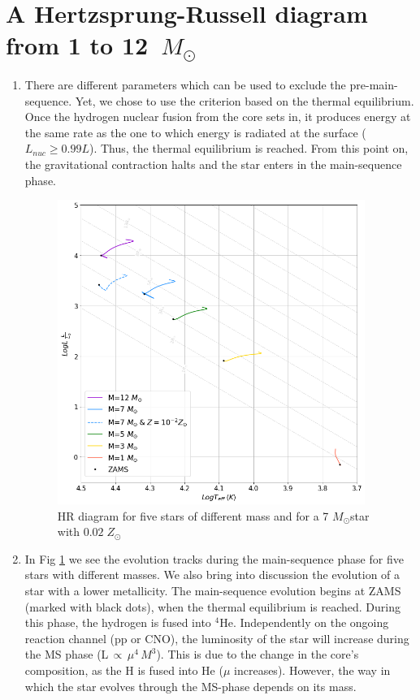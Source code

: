\documentclass{article}
\newcommand{\msun}{\ensuremath{M_\odot}}
\begin{document}
\section{A Hertzsprung-Russell diagram from 1 to 12~\msun}


\begin{enumerate}
    \item There are different parameters which can be used to exclude the pre-main-sequence. Yet, we chose to use the criterion based on the thermal equilibrium. Once the hydrogen nuclear fusion from the core sets in, it produces energy at the same rate as the one to which energy is radiated at the surface ($L_{nuc} \geq 0.99L$). Thus, the thermal equilibrium is reached. From this point on, the gravitational contraction halts and the star enters in the main-sequence phase. 
    
    \begin{figure}[H]
    \centering
    \includegraphics[width=10cm]{plots/HR_lowZ.pdf}
    \caption{HR diagram for five stars of different mass and for a 7 \msun star with $0.02 \; Z_{\odot}$}
    \label{fig:HR1}
    \end{figure}
    
    \item In Fig \ref{fig:HR1} we see the evolution tracks during the main-sequence phase for five stars with different masses. We also bring into discussion the evolution of a star with a lower metallicity. The main-sequence evolution begins at ZAMS (marked with black dots), when the thermal equilibrium is reached. During this phase, the hydrogen is fused into $^4$He. Independently on the ongoing reaction channel (pp or CNO), the luminosity of the star will increase during the MS phase (L$\,\propto\,\mu^{4}\,M^3$). This is due to the change in the core's composition, as the H is fused into He ($\mu$ increases). However, the way in which the star evolves through the MS-phase depends on its mass. 
    

\end{enumerate}
\end{document}
